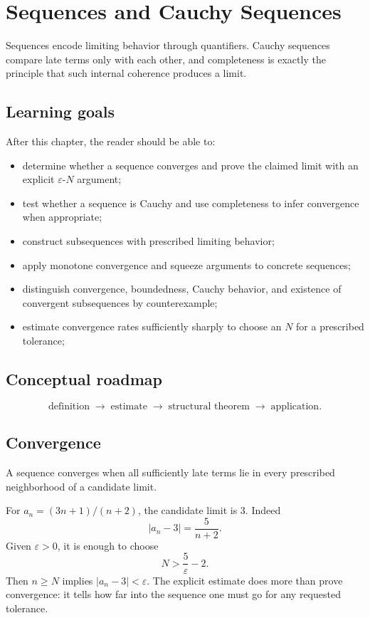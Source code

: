 \chapter{Sequences and Cauchy Sequences}
\label{ch:ii03}

Sequences encode limiting behavior through quantifiers. Cauchy sequences compare late terms only with each other, and completeness is exactly the principle that such internal coherence produces a limit.

\section*{Learning goals}
After this chapter, the reader should be able to:
\begin{itemize}
\item determine whether a sequence converges and prove the claimed limit with an explicit \(\varepsilon\)-\(N\) argument;
\item test whether a sequence is Cauchy and use completeness to infer convergence when appropriate;
\item construct subsequences with prescribed limiting behavior;
\item apply monotone convergence and squeeze arguments to concrete sequences;
\item distinguish convergence, boundedness, Cauchy behavior, and existence of convergent subsequences by counterexample;
\item estimate convergence rates sufficiently sharply to choose an \(N\) for a prescribed tolerance;
\end{itemize}
\section*{Conceptual roadmap}
\[
\boxed{\text{definition}\;\longrightarrow\;\text{estimate}\;\longrightarrow\;\text{structural theorem}\;\longrightarrow\;\text{application}.}
\]

\section{Convergence}
A sequence converges when all sufficiently late terms lie in every prescribed neighborhood of a candidate limit.


\begin{example}\label{ex:ii03-expand-01}
For \(a_n=(3n+1)/(n+2)\), the candidate limit is \(3\). Indeed
\[
|a_n-3|=\frac5{n+2}.
\]
Given \(\varepsilon>0\), it is enough to choose
\[
N>\frac5\varepsilon-2.
\]
Then \(n\ge N\) implies \(|a_n-3|<\varepsilon\). The explicit estimate does
more than prove convergence: it tells how far into the sequence one must go
for any requested tolerance.
\end{example}
